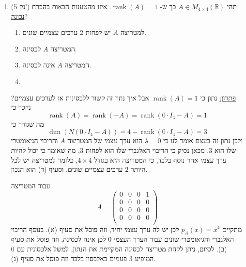 \documentclass[12pt, a4paper]{article}
\newcommand{\rr}{\mathbb{R}}
\DeclareMathOperator{\rank}{rank}
\newcommand{\points}[1]{(#1 נק') }
\begin{document}
\begin{enumerate}
\underline{פתרון:}
אם נקח
$A=B=I_3$
שאלה כמובן מדורגות קנונית, אז
$A+B=2I_3$
אינה מדורגת קנונית ופסלנו את סעיף (ב). בנוסף פסלנו את סעיף (ג), כי
$\det(A)=\det(B)=1$
ולכן המכפלה שווה
$1$.

אם נקח את
$A=I_3,B=0$
שהן מדורגות קנונית אז 
$A-B=I_3$
ואין לה שורת אפסים, אז פסלנו את סעיף (ד).
לכן
סעיף (א) נכון. 

ניתן להסביר זאת כך: 
אם במטריצה מדורגת קנונית אין שורת אפסים אז היא בהכרח
$I_3$,
ולכן הדטרמיננטה של מדורגת קנונית תהיה
$0$
(אם יש בה שורת אפסים)
או
$1$
(אם אין בה שורת אפסים). בכל מקרה, זה נכון עבור
$\det(A)$
וגם עבור
$\det(B)$
אז בהכרח
$\det(A)+\det(B)\le 2$.

\noindent\rule{16cm}{0.4pt}


\item\points{5}
תהי 
$A\in M_{4\times 4}(\rr)$
כך ש-
$\rank(A)=1$. איזו מהטענות הבאות 
\underline{בהכרח נכונה}?
\begin{enumerate}
    \item למטריצה $A$
    יש 
    לפחות
    2 ערכים עצמיים שונים.
    \item המטריצה $A$ לכסינה.
        \item המטריצה $A$ אינה לכסינה.
         \item 
\end{enumerate}

\underline{פתרון:}
נתון כי
$\rank(A)=1$
אבל איך נתון זה קשור ללכסינות או לערכים עצמיים? ניזכר כי
$$\rank(A)=\rank(-A)=\rank(0\cdot I_4-A)=1$$
מה שגורר כי
$$\dim(N(0\cdot I_4-A))=4-\rank(0\cdot I_4-A)=3$$
ולכן נתון זה בעצם אומר לנו כי
$\lambda=0$
הוא ערך עצמי של המטריצה
$A$
והריבוי הגיאומטרי שלו הוא
$3$.
מכאן נסיק כי הריבוי האלגברי שלו הוא לפחות
$3$,
מה שאומר כי יכול להיות ערך עצמי אחד נוסף בלבד, כי המטריצה היא בגודל
$4\times4$,
כלומר למטריצה יש לכל היותר
$2$
ערכים עצמיים שונים, וסעיף (ד) הוא הנכון.

עבור המטריצה
$$A=\begin{pmatrix}
    0&0&0&1\\
    0&0&0&0\\
    0&0&0&0\\
    0&0&0&0\\
\end{pmatrix}$$
מתקיים
$p_A(x)=x^4$
לכן יש לה ערך עצמי יחיד, וזה פוסל את סעיף (א).
בנוסף הריבוי האלגברי והגיאומטרי שונים עבור הערך העצמי $0$
לכן אינה לכסינה, וזה פוסל את סעיף (ב). לסיום, ניתן לקחת מטריצה לכסינה המקיימת את הנתון, למשל אלכסונית עם
$0$
המופיע 
$3$
פעמים באלכסון בלבד וזה פוסל את סעיף (ג).

\pagebreak

\end{enumerate}
\end{document}
